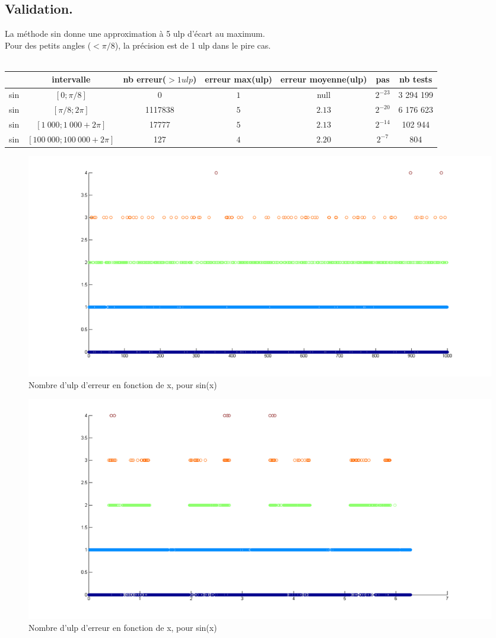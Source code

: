 \documentclass[a4,12pt]{article}
\begin{document}
\subsection{Validation.}
La méthode sin donne une approximation à 5 ulp d'écart au maximum.\\
Pour des petits angles ($<\pi /8$), la précision est de 1 ulp dans le pire cas.\\
\\

\hspace{-4cm}\begin{tabular}{|c|c|c|c|c|c|c|}

\hline 
 & intervalle & nb erreur($>1 ulp$) & erreur max(ulp)& erreur moyenne(ulp) & pas & nb tests \\
\hline 
sin & $[0; \pi /8]$             & 0       & $1$ & null        &$2^{-23}$ & 3 294 199\\
\hline 
sin & $[\pi /8; 2\pi]$          & 1117838 & $5$ &$2.13$ & $2^{-20}$ & 6 176 623\\
\hline 
sin & $[1\ 000; 1\ 000 + 2\pi]$     & 17777    & $5$ &$2.13$ & $2^{-14}$ & 102 944\\
\hline 
sin & $[100\ 000; 100\ 000 + 2\pi]$ & 127      & $4$ &$ 2.20$ & $2^{-7}$ & 804\\
\hline
\end{tabular}
\newline
\hspace{-8cm}\begin{figure}[h!]
    \centering
    \includegraphics[scale=0.5]{sin1000}
    \caption{Nombre d'ulp d'erreur en fonction de x, pour sin(x)}
    \label{fig:my_label}
\end{figure}
\newline
\hspace{-8cm}\begin{figure}[h!]

    \centering
    \includegraphics[scale=0.5]{sin2PI}
    \caption{Nombre d'ulp d'erreur en fonction de x, pour sin(x)}
    \label{fig:my_label}
\end{figure}
\end{document}
